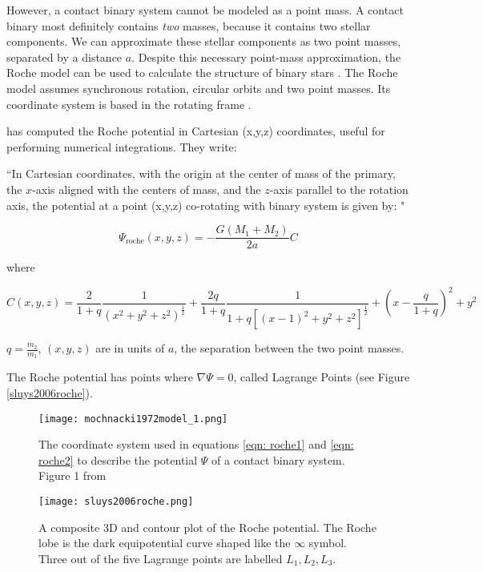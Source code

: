 \documentclass[12pt]{article} %
\numberwithin{equation}{section} %
\begin{document}
However, a contact binary system cannot be modeled as a point mass. A contact binary most definitely contains \emph{two} masses, because it contains two stellar components. We can approximate these stellar components as two point masses, separated by a distance $a$. Despite this necessary point-mass approximation, the Roche model can be used to calculate the structure of binary stars \citep{kippenhahn1970simple}. The Roche model assumes synchronous rotation, circular orbits and two point masses. Its coordinate system is based in the rotating frame \citep{kopal1959close}.

\citet{mochnacki1984accurate} has computed the Roche potential in Cartesian (x,y,z) coordinates, useful for performing numerical integrations. They write:

``In Cartesian coordinates, with the origin at the center of mass of the primary, the $x$-axis aligned with the centers of mass, and the $z$-axis parallel to the rotation axis, the potential at a point (x,y,z) co-rotating with binary system is given by: "

\begin{equation} \label{eqn: roche1}
\Psi_{\text{roche}}(x,y,z)= -\frac{G(M_{1} + M_{2})}{2a} C
\end{equation}

where 

\begin{equation} \label{eqn: roche2}
C(x,y,z) = \frac{2}{1+q} \frac{1}{(x^{2} + y^{2} + z^{2})^{\frac{1}{2}}} + \frac{2q}{1 + q} \frac{1}{1 + q[(x -1)^{2} + y^{2} + z^{2}]^{\frac{1}{2}}} + (x - \frac{q}{1 + q})^{2} + y^{2}
\end{equation}

$q = \frac{m_{2}}{m_{1}}$, $(x,y,z)$ are in units of $a$, the separation between the two point masses.

The Roche potential has points where $\nabla \Psi = 0$, called Lagrange Points (see Figure \ref{sluys2006roche}). 

\begin{figure}[H]
\centering
\texttt{[image: mochnacki1972model\_1.png]}
\caption{The coordinate system used in equations \ref{eqn: roche1} and \ref{eqn: roche2} to describe the potential $\Psi$ of a contact binary system. Figure 1 from \citet{mochnacki1972model}}
\label{fig: mochnacki1972model_1}
\end{figure}

\begin{figure}[H]
\centering
\texttt{[image: sluys2006roche.png]}
\caption{A composite 3D and contour plot of the Roche potential. The Roche lobe is the dark equipotential curve shaped like the $\infty$ symbol. Three out of the five Lagrange points are labelled $L_{1}, L_{2}, L_{3}$.  \citep{sluys2006roche}}
\label{fig: sluys2006roche}
\end{figure}
\end{document}
